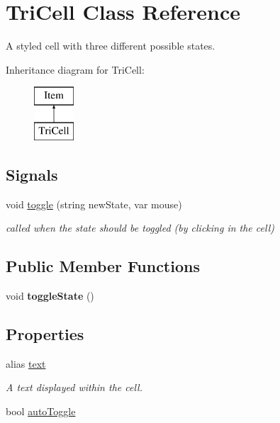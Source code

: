 \hypertarget{classTriCell}{\section{Tri\-Cell Class Reference}
\label{classTriCell}
}


A styled cell with three different possible states.  


Inheritance diagram for Tri\-Cell\-:\begin{figure}[H]
\begin{center}
\leavevmode
\includegraphics[height=2.000000cm]{classTriCell}
\end{center}
\end{figure}
\subsection*{Signals}
\begin{DoxyCompactItemize}
\item 
\hypertarget{classTriCell_a2db68cecb601d02fe73637ec5b5f3fb9}{void \hyperlink{classTriCell_a2db68cecb601d02fe73637ec5b5f3fb9}{toggle} (string new\-State, var mouse)}\label{classTriCell_a2db68cecb601d02fe73637ec5b5f3fb9}

\begin{DoxyCompactList}\small\item\em called when the state should be toggled (by clicking in the cell) \end{DoxyCompactList}\end{DoxyCompactItemize}
\subsection*{Public Member Functions}
\begin{DoxyCompactItemize}
\item 
\hypertarget{classTriCell_aae2f77800d2e5220e8e248a8e9dff234}{void {\bfseries toggle\-State} ()}\label{classTriCell_aae2f77800d2e5220e8e248a8e9dff234}

\end{DoxyCompactItemize}
\subsection*{Properties}
\begin{DoxyCompactItemize}
\item 
\hypertarget{classTriCell_af983c3fac0faae45c732ee4957b1bd11}{alias \hyperlink{classTriCell_af983c3fac0faae45c732ee4957b1bd11}{text}}\label{classTriCell_af983c3fac0faae45c732ee4957b1bd11}

\begin{DoxyCompactList}\small\item\em A text displayed within the cell. \end{DoxyCompactList}\item 
bool \hyperlink{classTriCell_a0be9a37b36e9ef3979ad775469415e69}{auto\-Toggle}
\end{DoxyCompactItemize}


